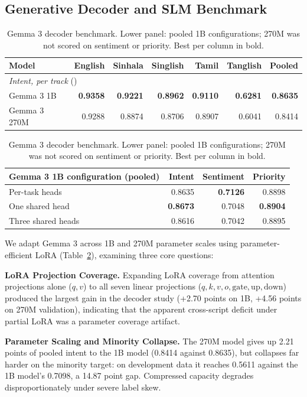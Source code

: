 \subsection{Generative Decoder and SLM Benchmark}

\begin{table}[!htbp]
\caption{Gemma 3 decoder benchmark. Lower panel: pooled 1B configurations;
270M was not scored on sentiment or priority. Best per column in bold.}
\label{tab:decoder_benchmark}
\centering
\scriptsize
\setlength{\tabcolsep}{3.2pt}
\begin{tabular}{@{}lrrrrrr@{}}
\toprule
Model & English & Sinhala & Singlish & Tamil & Tanglish & Pooled \\
\midrule
\multicolumn{7}{l}{\textit{Intent, per track} (\macrof{})} \\
Gemma 3 1B   & \textbf{0.9358} & \textbf{0.9221} & \textbf{0.8962} & \textbf{0.9110} & \textbf{0.6281} & \textbf{0.8635} \\
Gemma 3 270M & 0.9288 & 0.8874 & 0.8706 & 0.8907 & 0.6041 & 0.8414 \\
\bottomrule
\end{tabular}

\vspace{4pt}
\begin{tabular}{@{}lrrr@{}}
\toprule
Gemma 3 1B configuration (pooled) & Intent & Sentiment & Priority \\
\midrule
Per-task heads    & 0.8635 & \textbf{0.7126} & 0.8898 \\
One shared head   & \textbf{0.8673} & 0.7048 & \textbf{0.8904} \\
Three shared heads & 0.8616 & 0.7042 & 0.8895 \\
\bottomrule
\end{tabular}
\end{table}

We adapt Gemma 3 across 1B and 270M parameter scales using parameter-efficient LoRA  (Table~\ref{tab:decoder_benchmark}), examining three core questions:

\textbf{LoRA Projection Coverage.} Expanding LoRA coverage from attention projections alone ($q, v$) to all seven linear projections ($q, k, v, o, \mathrm{gate}, \mathrm{up}, \mathrm{down}$) produced the largest gain in the decoder study (+2.70 points on 1B, +4.56 points on 270M validation), indicating that the apparent cross-script deficit under partial LoRA was a parameter coverage artifact.

\textbf{Parameter Scaling and Minority Collapse.} The 270M model gives up 2.21 points of pooled intent \macrof{} to the 1B model (0.8414 against 0.8635), but collapses far harder on the minority target: on development data it reaches 0.5611 \negf{} against the 1B model's 0.7098, a 14.87 point gap. Compressed capacity degrades disproportionately under severe label skew.

